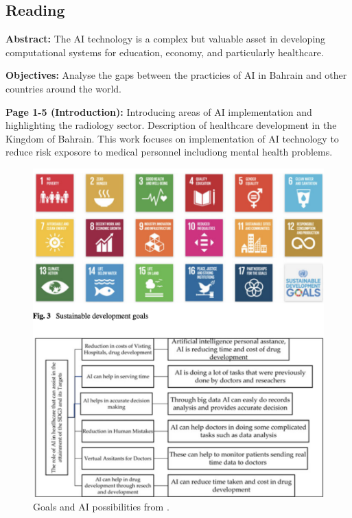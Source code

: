 \subsection{Reading}
    \textbf{Abstract:}
    The AI technology is a complex but valuable asset in developing computational systems for education, economy, and particularly healthcare.
    
    \textbf{Objectives:}
    Analyse the gaps between the practicies of AI in Bahrain and other countries around the world.

    \textbf{Page 1-5 (Introduction):}
    Introducing areas of AI implementation and highlighting the radiology sector. Description of healthcare development in the Kingdom of Bahrain. This work focuses on implementation of AI technology to reduce risk exposore to medical personnel includiong mental health problems. 
    \begin{figure}[H]
        \centering
        \includegraphics[width=1\textwidth]{figures/SR0023US23/fig2.png}
        \caption{Goals and AI possibilities from \cite{x101}.}
        \label{fig2:SR0023US23}
    \end{figure}

